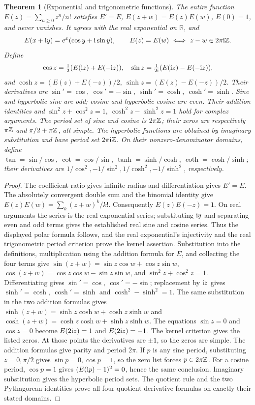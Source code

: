\documentclass[11pt,a4paper,openany]{book}
\newtheorem{theorem}{Theorem}[chapter]
\theoremstyle{definition}
\theoremstyle{remark}\newtheorem{remark}[theorem]{Remark}
\newcommand{\R}{\mathbb R}\newcommand{\C}{\mathbb C}
\newcommand{\family}[1]{}
\begin{document}
\begin{theorem}[Exponential and trigonometric functions]\family{D12.02.03}\label{d12:02-03}
The entire function \(E(z)=\sum_{n\ge0}z^n/n!\) satisfies
\(E'=E\), \(E(z+w)=E(z)E(w)\), \(E(0)=1\), and never vanishes.
It agrees with the real exponential on \(\R\), and
\[
 E(x+\mathrm i y)=e^x(\cos y+\mathrm i\sin y),\qquad
 E(z)=E(w)\ \Longleftrightarrow\ z-w\in2\pi\mathrm i\mathbb Z .
\]
Define
\[
 \cos z=\tfrac12(E(\mathrm i z)+E(-\mathrm i z)),\quad
 \sin z=\tfrac1{2\mathrm i}(E(\mathrm i z)-E(-\mathrm i z)),
\]
and \(\cosh z=(E(z)+E(-z))/2,\ \sinh z=(E(z)-E(-z))/2\).
Their derivatives are \(\sin'=\cos,\ \cos'=-\sin,\
\sinh'=\cosh,\ \cosh'=\sinh\). Sine and hyperbolic sine are odd;
cosine and hyperbolic cosine are even. Their addition identities and
\(\sin^2z+\cos^2z=1,\ \cosh^2z-\sinh^2z=1\) hold for complex
arguments. The period set of sine and cosine is \(2\pi\mathbb Z\);
their zeros are respectively \(\pi\mathbb Z\) and \(\pi/2+\pi\mathbb Z\), all simple.
The hyperbolic functions are obtained by imaginary substitution and
have period set \(2\pi\mathrm i\mathbb Z\). On their nonzero-denominator domains,
define \(\tan=\sin/\cos,\ \cot=\cos/\sin,\
\tanh=\sinh/\cosh,\ \coth=\cosh/\sinh\); their derivatives are
\(1/\cos^2,-1/\sin^2,1/\cosh^2,-1/\sinh^2\), respectively.
\end{theorem}
\begin{proof}
The coefficient ratio gives infinite radius and differentiation gives
\(E'=E\). The absolutely convergent double sum and the binomial identity
give \(E(z)E(w)=\sum_k(z+w)^k/k!\).
Consequently \(E(z)E(-z)=1\).
On real arguments the series is the real exponential series; substituting
\(\mathrm i y\) and separating even and odd terms gives the established real
sine and cosine series. Thus the displayed polar formula follows, and
the real exponential's injectivity and the real trigonometric period
criterion prove the kernel assertion. Substitution into the definitions,
multiplication using the addition formula for \(E\), and collecting the
four terms give
\(\sin(z+w)=\sin z\cos w+\cos z\sin w\),
\(\cos(z+w)=\cos z\cos w-\sin z\sin w\), and
\(\sin^2z+\cos^2z=1\).
Differentiating gives \(\sin'=\cos,\ \cos'=-\sin\); replacement by
\(\mathrm i z\) gives \(\sinh'=\cosh,\ \cosh'=\sinh\) and
\(\cosh^2-\sinh^2=1\).
The same substitution in the two addition formulas gives
\(\sinh(z+w)=\sinh z\cosh w+\cosh z\sinh w\) and
\(\cosh(z+w)=\cosh z\cosh w+\sinh z\sinh w\).
The equations \(\sin z=0\) and \(\cos z=0\) become
\(E(2\mathrm i z)=1\) and \(E(2\mathrm i z)=-1\). The kernel criterion gives the
listed zeros. At those points the derivatives are \(\pm1\), so the
zeros are simple. The addition formulas give parity and period \(2\pi\).
If \(p\) is any sine period, substituting \(z=0,\pi/2\) gives
\(\sin p=0,\cos p=1\), so the zero list forces \(p\in2\pi\mathbb Z\).
For a cosine period, \(\cos p=1\) gives
\((E(\mathrm i p)-1)^2=0\), hence the same conclusion.
Imaginary substitution gives the hyperbolic period sets.
The quotient rule and the two Pythagorean identities prove all four
quotient derivative formulas on exactly their stated domains.
\end{proof}
\end{document}
